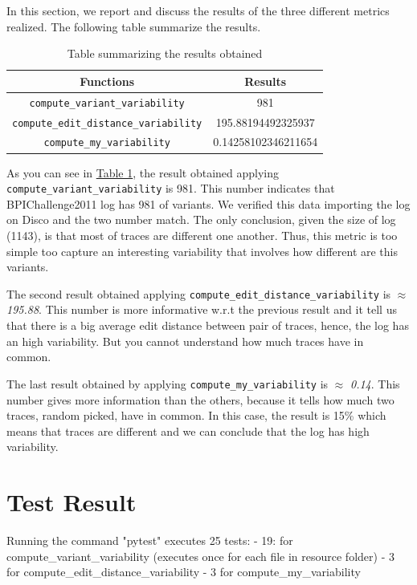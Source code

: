 \documentclass[12pt]{article}
\begin{document}
In this section, we report and discuss the results of the three different metrics realized. The following table summarize the results.
\renewcommand{\arraystretch}{1.5}\\
\begin{table}[H]
	\centering
		\begin{tabular}{ |c|c|  }
			\hline
			\textbf{Functions} & \textbf{Results }\\
			\hline
			\texttt{compute\_variant\_variability} & 981 \\ \hline
			\texttt{compute\_edit\_distance\_variability} & 195.88194492325937 \\ \hline
			\texttt{compute\_my\_variability} & 0.14258102346211654 \\
			\hline
		\end{tabular}
	\caption{Table summarizing the results obtained}
	\label{table:results}
\end{table}

As you can see in \hyperref[table:results]{Table 1}, the result obtained applying \texttt{compute\_variant\_variability} is 981. This number indicates that BPIChallenge2011 log has 981 of variants. We verified this data importing the log on Disco and the two number match. The only conclusion, given the size of log (1143), is that most of traces are different one another. Thus, this metric is too simple too capture an interesting variability that involves how different are this variants.

\smallskip  

The second result obtained applying \texttt{compute\_edit\_distance\_variability} is $\approx$ \textit{195.88}. This number is more informative w.r.t the previous result and it tell us that there is a big average edit distance between pair of traces, hence, the log has an high variability. But you cannot understand how much traces have in common.

\smallskip

The last result obtained by applying \texttt{compute\_my\_variability} is $\approx$ \textit{0.14}. This number gives more information than the others, because it tells how much two traces, random picked, have in common. In this case, the result is 15\% which means that traces are different and we can conclude that the log has high variability.
\newpage

\section*{Test Result}
Running the command "pytest" executes 25 tests:
- 19: for compute_variant_variability (executes once for each file in resource folder)
- 3 for compute_edit_distance_variability
- 3 for compute_my_variability
\end{document}
